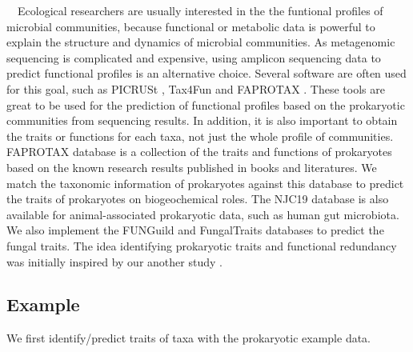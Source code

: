 \documentclass[
]{book}
\newenvironment{Shaded}{\begin{snugshade}}{\end{snugshade}}
\newcommand{\AttributeTok}[1]{\textcolor[rgb]{0.77,0.63,0.00}{#1}}
\newcommand{\CommentTok}[1]{\textcolor[rgb]{0.56,0.35,0.01}{\textit{#1}}}
\newcommand{\FunctionTok}[1]{\textcolor[rgb]{0.00,0.00,0.00}{#1}}
\newcommand{\NormalTok}[1]{#1}
\newcommand{\OtherTok}[1]{\textcolor[rgb]{0.56,0.35,0.01}{#1}}
\newcommand{\SpecialCharTok}[1]{\textcolor[rgb]{0.00,0.00,0.00}{#1}}
\newcommand{\StringTok}[1]{\textcolor[rgb]{0.31,0.60,0.02}{#1}}
\begin{document}
　Ecological researchers are usually interested in the the funtional profiles of microbial communities,
because functional or metabolic data is powerful to explain the structure and dynamics of microbial communities.
As metagenomic sequencing is complicated and expensive, using amplicon sequencing data to predict functional profiles is an alternative choice.
Several software are often used for this goal, such as PICRUSt \citep{Langille_Predictive_2013}, Tax4Fun \citep{Aßhauer_Tax4Fun_2015} and FAPROTAX \citep{Louca_High_2016, Louca_Decoupling_2016}.
These tools are great to be used for the prediction of functional profiles based on the prokaryotic communities from sequencing results.
In addition, it is also important to obtain the traits or functions for each taxa, not just the whole profile of communities.
FAPROTAX database is a collection of the traits and functions of prokaryotes based on the known research results published in books and literatures.
We match the taxonomic information of prokaryotes against this database to predict the traits of prokaryotes on biogeochemical roles.
The NJC19 database \citep{Lim_Large_2020} is also available for animal-associated prokaryotic data, such as human gut microbiota.
We also implement the FUNGuild \citep{Nguyen_FUNGuild_2016} and FungalTraits \citep{Polme_FungalTraits_2020} databases to predict the fungal traits.
The idea identifying prokaryotic traits and functional redundancy was initially inspired by our another study \citep{Liu_Microbial_2022}.

\hypertarget{example-8}{%
\subsection{Example}\label{example-8}}

We first identify/predict traits of taxa with the prokaryotic example data.

\begin{Shaded}
\end{Shaded}
\end{document}
